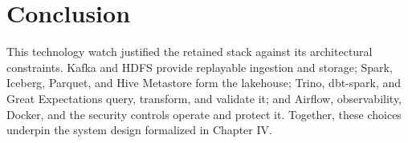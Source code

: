 \section{Conclusion}
This technology watch justified the retained \projectname{} stack against its architectural constraints. Kafka and HDFS provide replayable ingestion and storage; Spark, Iceberg, Parquet, and Hive Metastore form the lakehouse; Trino, dbt-spark, and Great Expectations query, transform, and validate it; and Airflow, observability, Docker, and the security controls operate and protect it. Together, these choices underpin the system design formalized in Chapter IV.

